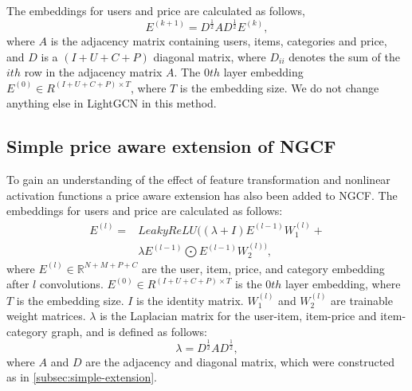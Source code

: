 The embeddings for users and price are calculated as follows,
\begin{equation}
    E^{(k+1)} = D^{\frac{1}{2}}AD^{\frac{1}{2}}E^{(k)},
\end{equation}
where $A$ is the adjacency matrix containing users, items, categories and price, and $D$ is a $(I + U + C + P)$ diagonal matrix, where $D_{ii}$ denotes the sum of the $ith$ row in the adjacency matrix $A$.
The $0th$ layer embedding $E^{(0)} \in R^{(I + U + C + P)\times T}$, where $T$ is the embedding size.
We do not change anything else in LightGCN in this method.

\subsection{Simple price aware extension of NGCF}
To gain an understanding of the effect of feature transformation and nonlinear activation functions a price aware extension has also been added to NGCF.
The embeddings for users and price are calculated as follows:
\begin{equation}
    \begin{split}
        E^{(l)} = &LeakyReLU((\lambda + I)E^{(l-1)}W_1^{(l)}+\\
        & \lambda E^{(l-1)}\bigodot E^{(l-1)}W_2^{(l))},
    \end{split}
\end{equation}
where $E^{(l)} \in \mathbb{R}^{N+M+P+C}$ are the user, item, price, and category embedding after $l$ convolutions.
$E^{(0)} \in R^{(I + U + C + P)\times T}$ is the $0th$ layer embedding, where $T$ is the embedding size.
$I$ is the identity matrix.
$W_1^{(l)}$ and $W_2^{(l)}$ are trainable weight matrices.
$\lambda$ is the Laplacian matrix for the user-item, item-price and item-category graph, and is defined as follows:
\begin{equation}
    \lambda = D^{\frac{1}{2}}AD^{\frac{1}{2}},
\end{equation}
where $A$ and $D$ are the adjacency and diagonal matrix, which were constructed as in \autoref{subsec:simple-extension}.
